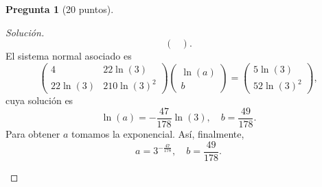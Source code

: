 \documentclass[letterpaper,12pt]{article}
\theoremstyle{definition}
\newtheorem{question}{Pregunta}
\numberwithin{equation}{question}
\newenvironment{solution}{\begin{proof}[Solución]}{\end{proof}}
\begin{document}
\begin{question}[20 puntos]
\begin{solution}
\begin{equation*}
\begin{pmatrix}
\end{pmatrix}.
\end{equation*}
%
El sistema normal asociado es
%
\begin{equation*}
\begin{pmatrix}
4 & 22 \ln(3)\\ 22 \ln(3) & 210 \ln(3)^2
\end{pmatrix}
\begin{pmatrix}
\ln(a)\\ b
\end{pmatrix}
= \begin{pmatrix}
5 \ln(3)\\ 52 \ln(3)^2
\end{pmatrix},
\end{equation*}
%
cuya solución es
%
\begin{equation*}
\ln(a) = -\frac{47}{178}\ln(3), \quad b = \frac{49}{178}.
\end{equation*}
%
Para obtener $a$ tomamos la exponencial.
Así, finalmente,
%
\begin{equation*}
a = 3^{-\frac{47}{178}}, \quad b = \frac{49}{178}.
\end{equation*}
\bigskip
\begin{center}\end{center}
\end{solution}
\end{question}
\end{document}

